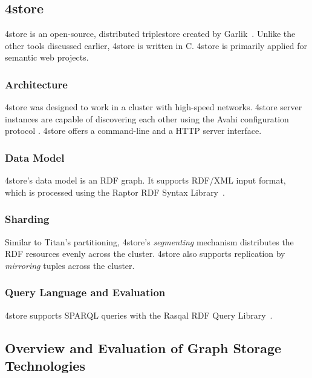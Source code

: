 
\subsection{4store}
\label{4store}

4store is an open-source, distributed triplestore created by Garlik~\cite{4store}. Unlike the other tools discussed earlier, 4store is written in C. 4store is primarily applied for semantic web projects.

\subsubsection{Architecture}

4store was designed to work in a cluster with high-speed networks. 4store server instances are capable of discovering each other using the Avahi configuration protocol \cite{Avahi}. 4store offers a command-line and a HTTP server interface. 

\subsubsection{Data Model}

4store's data model is an RDF graph. It supports RDF/XML input format, which is processed using the Raptor RDF Syntax Library~\cite{Raptor}.

\subsubsection{Sharding}

Similar to Titan's partitioning, 4store's \emph{segmenting} mechanism distributes the RDF resources evenly across the cluster. 4store also supports replication by \emph{mirroring} tuples across the cluster.

\subsubsection{Query Language and Evaluation}

4store supports SPARQL queries with the Rasqal RDF Query Library~\cite{Rasqal}.  


\subsection{Overview and Evaluation of Graph Storage Technologies}

